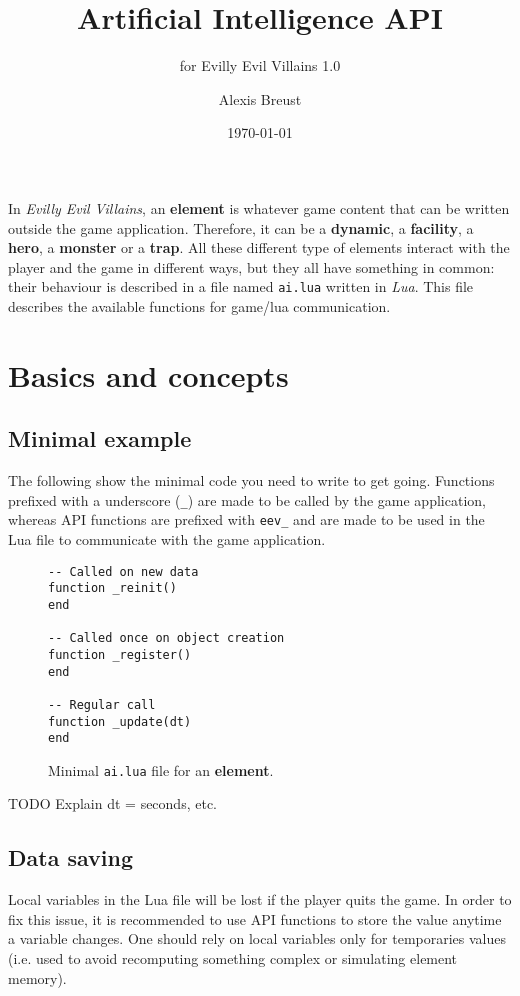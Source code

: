 \documentclass[10pt,a4paper]{scrartcl}
\title{Artificial Intelligence API}
\subtitle{for Evilly Evil Villains 1.0}
\author{Alexis Breust}
\date{\today}
\begin{document}
\maketitle

In \textit{Evilly Evil Villains}, an \textbf{element} is whatever game content that can be written outside the game application. Therefore, it can be a \textbf{dynamic}, a \textbf{facility}, a \textbf{hero}, a \textbf{monster} or a \textbf{trap}. All these different type of elements interact with the player and the game in different ways, but they all have something in common: their behaviour is described in a file named \texttt{ai.lua} written in \textit{Lua}. This file describes the available functions for game/lua communication.

\section{Basics and concepts}
\subsection{Minimal example}
The following show the minimal code you need to write to get going. Functions prefixed with a underscore (\verb#_#) are made to be called by the game application, whereas API functions are prefixed with \verb#eev_# and are made to be used in the Lua file to communicate with the game application.
\begin{figure}[h!]
\centering
\begin{minipage}{0.4\textwidth}
\begin{verbatim}
-- Called on new data
function _reinit()
end

-- Called once on object creation
function _register()
end

-- Regular call
function _update(dt)
end
\end{verbatim}
\end{minipage}
\caption{Minimal \texttt{ai.lua} file for an \textbf{element}.}
\end{figure}

TODO Explain dt = seconds, etc.

\subsection{Data saving}
Local variables in the Lua file will be lost if the player quits the game. In order to fix this issue, it is recommended to use API functions to store the value anytime a variable changes. One should rely on local variables only for temporaries values (i.e. used to avoid recomputing something complex or simulating element memory).
\end{document}

